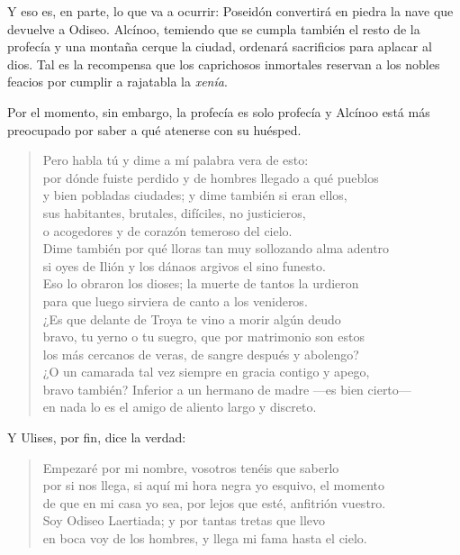 Y eso es, en parte, lo que va a ocurrir: Poseidón convertirá en piedra la nave que devuelve a Odiseo. Alcínoo, temiendo que se cumpla también el resto de la profecía y una montaña cerque la ciudad, ordenará sacrificios para aplacar al dios. Tal es la recompensa que los caprichosos inmortales reservan a los nobles feacios por cumplir a rajatabla la \emph{xenía}.

Por el momento, sin embargo, la profecía es solo profecía y Alcínoo está más preocupado por saber a qué atenerse con su huésped.

\begin{verse}
Pero habla tú y dime a mí palabra vera de esto:\\
por dónde fuiste perdido y de hombres llegado a qué pueblos\\
y bien pobladas ciudades; y dime también si eran ellos,\\
sus habitantes, brutales, difíciles, no justicieros,\\
o acogedores y de corazón temeroso del cielo.\\
Dime también por qué lloras tan muy sollozando alma adentro\\
si oyes de Ilión y los dánaos argivos el sino funesto.\\
Eso lo obraron los dioses; la muerte de tantos la urdieron\\
para que luego sirviera de canto a los venideros.\\
¿Es que delante de Troya te vino a morir algún deudo\\
bravo, tu yerno o tu suegro, que por matrimonio son estos\\
los más cercanos de veras, de sangre después y abolengo?\\
¿O un camarada tal vez siempre en gracia contigo y apego,\\
bravo también? Inferior a un hermano de madre ---es bien cierto---\\
en nada lo es el amigo de aliento largo y discreto.
\end{verse}

Y Ulises, por fin, dice la verdad:

\begin{verse}
Empezaré por mi nombre, vosotros tenéis que saberlo\\
por si nos llega, si aquí mi hora negra yo esquivo, el momento\\
de que en mi casa yo sea, por lejos que esté, anfitrión vuestro.\\
Soy Odiseo Laertiada; y por tantas tretas que llevo\\
en boca voy de los hombres, y llega mi fama hasta el cielo.
\end{verse}

